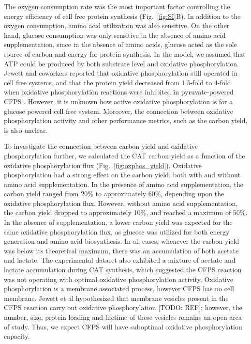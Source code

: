 \documentclass[journal=asbcd6,manuscript=article]{achemso}
\begin{document}

The oxygen consumption rate was the most important factor controlling the energy efficiency of cell free protein synthesis (Fig.~\ref{fig:SI}B).
In addition to the oxygen consumption, amino acid utilization was also sensitive.
On the other hand, glucose consumption was only sensitive in the absence of amino acid supplementation,
since in the absence of amino acids, glucose acted as the sole source of carbon and energy for protein synthesis.
In the model, we assumed that ATP could be produced by both substrate level and oxidative phosphorylation.
Jewett and coworkers reported that oxidative phosphorylation still operated in cell free systems, and that the protein
yield decreased from 1.5-fold to 4-fold when oxidative phosphorylation reactions were inhibited in pyruvate-powered CFPS \cite{Jewett:2008aa}.
However, it is unknown how active oxidative phosphorylation is for a glucose powered cell free system.
Moreover, the connection between oxidative phosphorylation activity and other performance metrics, such as the carbon yield, is also unclear.

To investigate the connection between carbon yield and oxidative phosphorylation further,
we calculated the CAT carbon yield as a function of the oxidative phosphorylation flux (Fig.~\ref{fig:oxphos_yield}).
Oxidative phosphorylation had a strong effect on the carbon yield, both with and without amino acid supplementation.
In the presence of amino acid supplementation, the carbon yield ranged from 20\% to approximately 60\%,
depending upon the oxidative phosphorylation flux.
However, without amino acid supplementation, the carbon yield dropped to approximately 10\%, and reached a maximum of 50\%.
In the absence of supplementation, a lower carbon yield was expected for the same oxidative phosphorylation flux, as glucose was utilized for both energy generation and amino acid biosynthesis.
In all cases, whenever the carbon yield was below its theoretical maximum, there was an accumulation of both acetate and lactate.
The experimental dataset also exhibited a mixture of acetate and lactate accumulation during CAT synthesis, which suggested the CFPS reaction was not
operating with optimal oxidative phosphorylation activity.
Oxidative phosphorylation is a membrane associated process, however CFPS has no cell membrane.
Jewett et al hypothesized that membrane vesicles present in the CFPS reaction carry out oxidative phosphorylation [TODO: REF];
however, the number, size, protein loading and lifetime of these vesicles remains an open area of study.
Thus, we expect CFPS will have suboptimal oxidative phosphorylation capacity.
\end{document}
